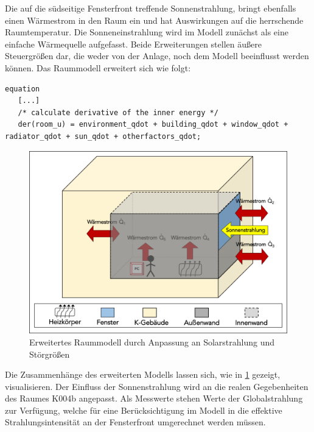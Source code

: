 Die auf die südseitige Fensterfront treffende Sonnenstrahlung, bringt ebenfalls einen Wärmestrom in den Raum ein und hat Auswirkungen auf die herrschende Raumtemperatur. Die Sonneneinstrahlung  wird im Modell zunächst als eine einfache Wärmequelle aufgefasst.
Beide Erweiterungen stellen äußere Steuergrößen dar, die weder von der Anlage, noch dem Modell beeinflusst werden können. Das Raummodell erweitert sich wie folgt:

\begin{lstlisting}[language=Modelica, caption={Erweitertes Gleichungssystem des Raummodells unter Berücksichtigung der Sonneneinstrahlung und weiterer Störgrößen},label=lst:raumdrei]
equation
   [...]
   /* calculate derivative of the inner energy */
   der(room_u) = environment_qdot + building_qdot + window_qdot + radiator_qdot + sun_qdot + otherfactors_qdot;
\end{lstlisting}

\begin{figure}
\centering
\includegraphics[width=\textwidth]{abbildungen/20160317_raumzwei}
\caption{Erweitertes Raummodell durch Anpassung an Solarstrahlung und Störgrößen}
\label{fig:raumdrei}
\end{figure}


Die Zusammenhänge des erweiterten Modells lassen sich, wie in \ref{fig:raumdrei} gezeigt, visualisieren. Der Einfluss der Sonnenstrahlung wird an die realen Gegebenheiten des Raumes K004b angepasst. Als Messwerte stehen Werte der Globalstrahlung zur Verfügung, welche für eine Berücksichtigung im Modell in die effektive Strahlungsintensität an der Fensterfront umgerechnet werden müssen.

